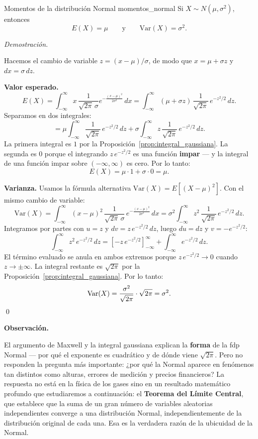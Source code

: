 \documentclass[12pt, a4paper]{book}
\newenvironment{observacion}{%
    \par\medskip\noindent\textbf{\color{azul}Observaci\'{o}n.}\enspace\itshape
}{\par\medskip}
\renewenvironment{proof}{%
    \par\medskip\noindent\textit{Demostraci\'{o}n.}\enspace
}{\qed\par\medskip}
\numberwithin{equation}{chapter}
\begin{document}
\begin{proposicion}{Momentos de la distribuci\'{o}n Normal}
	{momentos_normal}
	Si $X \sim N(\mu, \sigma^2)$, entonces
	\[
	E(X) = \mu \qquad \text{y} \qquad \mathrm{Var}(X) = \sigma^2.
	\]
\end{proposicion}

\begin{proof}
	Hacemos el cambio de variable $z = (x-\mu)/\sigma$, de modo
	que $x = \mu + \sigma z$ y $dx = \sigma\,dz$.
	
	\textbf{Valor esperado.}
	\[
	E(X) = \int_{-\infty}^{\infty} x\,\frac{1}{\sqrt{2\pi}\,\sigma}
	e^{-\frac{(x-\mu)^2}{2\sigma^2}}\,dx
	= \int_{-\infty}^{\infty} (\mu + \sigma z)\,
	\frac{1}{\sqrt{2\pi}}\,e^{-z^2/2}\,dz.
	\]
	Separamos en dos integrales:
	\[
	= \mu \int_{-\infty}^{\infty} \frac{1}{\sqrt{2\pi}}\,
	e^{-z^2/2}\,dz
	+ \sigma \int_{-\infty}^{\infty} z\,\frac{1}{\sqrt{2\pi}}\,
	e^{-z^2/2}\,dz.
	\]
	La primera integral es $1$ por la
	Proposición~\ref{prop:integral_gaussiana}. La segunda es $0$
	porque el integrando $z\,e^{-z^2/2}$ es una función
	\textbf{impar} --- y la integral de una función impar sobre
	$(-\infty, \infty)$ es cero. Por lo tanto:
	\[
	E(X) = \mu \cdot 1 + \sigma \cdot 0 = \mu.
	\]
	
	\textbf{Varianza.} Usamos la fórmula alternativa
	$\mathrm{Var}(X) = E\!\left[(X-\mu)^2\right]$. Con el mismo
	cambio de variable:
	\[
	\mathrm{Var}(X)
	= \int_{-\infty}^{\infty} (x-\mu)^2\,
	\frac{1}{\sqrt{2\pi}\,\sigma}\,
	e^{-\frac{(x-\mu)^2}{2\sigma^2}}\,dx
	= \sigma^2 \int_{-\infty}^{\infty} z^2\,
	\frac{1}{\sqrt{2\pi}}\,e^{-z^2/2}\,dz.
	\]
	Integramos por partes con $u = z$ y
	$dv = z\,e^{-z^2/2}\,dz$, luego $du = dz$ y
	$v = -e^{-z^2/2}$:
	\[
	\int_{-\infty}^{\infty} z^2\,e^{-z^2/2}\,dz
	= \left[-z\,e^{-z^2/2}\right]_{-\infty}^{\infty}
	+ \int_{-\infty}^{\infty} e^{-z^2/2}\,dz.
	\]
	El término evaluado se anula en ambos extremos porque
	$z\,e^{-z^2/2} \to 0$ cuando $z \to \pm\infty$. La integral
	restante es $\sqrt{2\pi}$ por la
	Proposición~\ref{prop:integral_gaussiana}. Por lo tanto:
	\[
	\mathrm{Var}(X) = \frac{\sigma^2}{\sqrt{2\pi}}
	\cdot \sqrt{2\pi} = \sigma^2. \qedhere
	\]
\end{proof}

\begin{observacion}
	El argumento de Maxwell y la integral gaussiana explican la
	\textbf{forma} de la fdp Normal --- por qué el exponente es
	cuadrático y de dónde viene $\sqrt{2\pi}$. Pero no responden
	la pregunta más importante: ¿por qué la Normal aparece en
	fenómenos tan distintos como alturas, errores de medición y
	precios financieros? La respuesta no está en la física de los
	gases sino en un resultado matemático profundo que estudiaremos
	a continuación: el \textbf{Teorema del Límite Central}, que
	establece que la suma de un gran número de variables aleatorias
	independientes converge a una distribución Normal,
	independientemente de la distribución original de cada una.
	Esa es la verdadera razón de la ubicuidad de la Normal.
\end{observacion}
\end{document}
